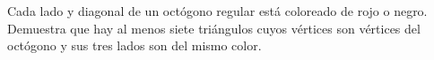 Cada lado y diagonal de un octógono regular está coloreado de rojo o negro. Demuestra que hay al menos siete triángulos cuyos vértices son vértices del octógono y sus tres lados son del mismo color.